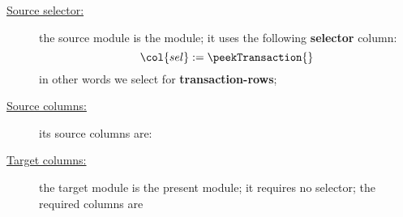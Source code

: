 \begin{description}
	\item[\underline{Source selector:}]
		the source module is the \hubMod{} module; it uses the following \textbf{selector} column:
		\[
			\col{sel} := \peekTransaction{}
		\]
		in other words we select for \textbf{transaction-rows};
	\item[\underline{Source columns:}]
		its source columns are:
		\begin{multicols}{3}
			\begin{enumerate}
					\lookupColumnsHubIntoTxnData{}
			\end{enumerate}
		\end{multicols}
	\item[\underline{Target columns:}]
		the target module is the present \userTxnDataMod{} module;
		it requires no selector;
		the required columns are
		\begin{multicols}{3}
			\begin{enumerate}
					\lookupColumnsHubIntoTxnData{}
			\end{enumerate}
		\end{multicols}
\end{description}


